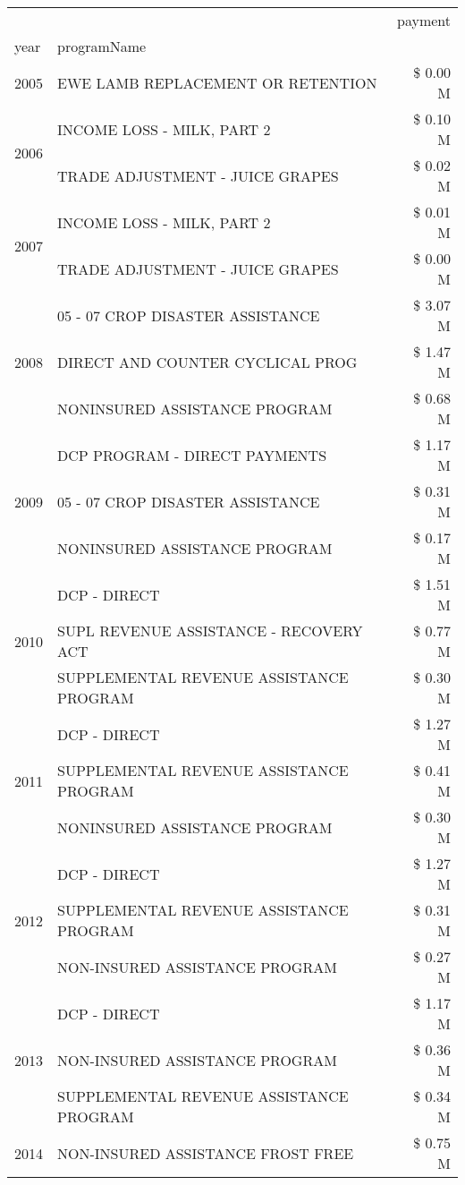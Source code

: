 \begin{tabular}{llr}
\toprule
 &  & payment \\
year & programName &  \\
\midrule
2005 & EWE LAMB REPLACEMENT OR RETENTION & \$ 0.00 M \\
\cline{1-3}
\multirow[t]{2}{*}{2006} & INCOME LOSS - MILK, PART 2 & \$ 0.10 M \\
 & TRADE ADJUSTMENT - JUICE GRAPES & \$ 0.02 M \\
\cline{1-3}
\multirow[t]{2}{*}{2007} & INCOME LOSS - MILK, PART 2 & \$ 0.01 M \\
 & TRADE ADJUSTMENT - JUICE GRAPES & \$ 0.00 M \\
\cline{1-3}
\multirow[t]{3}{*}{2008} & 05 - 07 CROP DISASTER ASSISTANCE & \$ 3.07 M \\
 & DIRECT AND COUNTER CYCLICAL PROG & \$ 1.47 M \\
 & NONINSURED ASSISTANCE PROGRAM & \$ 0.68 M \\
\cline{1-3}
\multirow[t]{3}{*}{2009} & DCP PROGRAM - DIRECT PAYMENTS & \$ 1.17 M \\
 & 05 - 07 CROP DISASTER ASSISTANCE & \$ 0.31 M \\
 & NONINSURED ASSISTANCE PROGRAM & \$ 0.17 M \\
\cline{1-3}
\multirow[t]{3}{*}{2010} & DCP - DIRECT & \$ 1.51 M \\
 & SUPL REVENUE ASSISTANCE - RECOVERY ACT & \$ 0.77 M \\
 & SUPPLEMENTAL REVENUE ASSISTANCE PROGRAM & \$ 0.30 M \\
\cline{1-3}
\multirow[t]{3}{*}{2011} & DCP - DIRECT & \$ 1.27 M \\
 & SUPPLEMENTAL REVENUE ASSISTANCE PROGRAM & \$ 0.41 M \\
 & NONINSURED ASSISTANCE PROGRAM & \$ 0.30 M \\
\cline{1-3}
\multirow[t]{3}{*}{2012} & DCP - DIRECT & \$ 1.27 M \\
 & SUPPLEMENTAL REVENUE ASSISTANCE PROGRAM & \$ 0.31 M \\
 & NON-INSURED ASSISTANCE PROGRAM & \$ 0.27 M \\
\cline{1-3}
\multirow[t]{3}{*}{2013} & DCP - DIRECT & \$ 1.17 M \\
 & NON-INSURED ASSISTANCE PROGRAM & \$ 0.36 M \\
 & SUPPLEMENTAL REVENUE ASSISTANCE PROGRAM & \$ 0.34 M \\
\cline{1-3}
\multirow[t]{3}{*}{2014} & NON-INSURED ASSISTANCE FROST FREE & \$ 0.75 M \\

\end{tabular}
